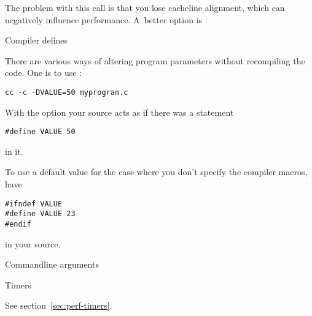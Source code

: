 The problem with this call is that you lose cacheline alignment, which
can negatively influence performance. A~better option is
.

 {Compiler defines}

There are various ways of altering program parameters without
recompiling the code. One is to use :
\begin{verbatim}
cc -c -DVALUE=50 myprogram.c
\end{verbatim}
With the  option your source acts as if there was a statement
\begin{verbatim}
#define VALUE 50
\end{verbatim}
in it.

To use a default value for the case where you don't specify the
compiler macros, have
\begin{verbatim}
#ifndef VALUE
#define VALUE 23
#endif
\end{verbatim}
in your source.

 {Commandline arguments}

 {Timers}

See section~\ref{sec:perf-timers}.
